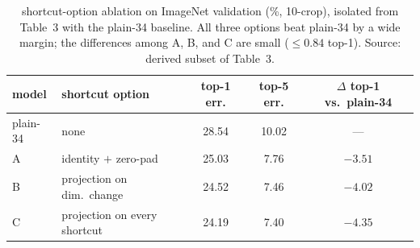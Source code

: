 \begin{table}[t]
\centering
\caption{ shortcut-option ablation on ImageNet validation (\%, 10-crop),
isolated from Table~3 with the plain-34 baseline. All three options beat plain-34 by a
wide margin; the differences among A, B, and C are small ($\le0.84$ top-1). Source:
derived subset of Table~3.}
\label{tab:shortcut}
\small
\begin{tabular}{l l c c c}
\toprule
model & shortcut option & top-1 err. & top-5 err. & $\Delta$ top-1 vs.\ plain-34 \\
\midrule
plain-34   & none                          & 28.54 & 10.02 & --- \\
\resnet-34 A & identity $+$ zero-pad        & 25.03 & 7.76 & $-3.51$ \\
\resnet-34 B & projection on dim.\ change   & 24.52 & 7.46 & $-4.02$ \\
\resnet-34 C & projection on every shortcut & 24.19 & 7.40 & $-4.35$ \\
\bottomrule
\end{tabular}
\end{table}
